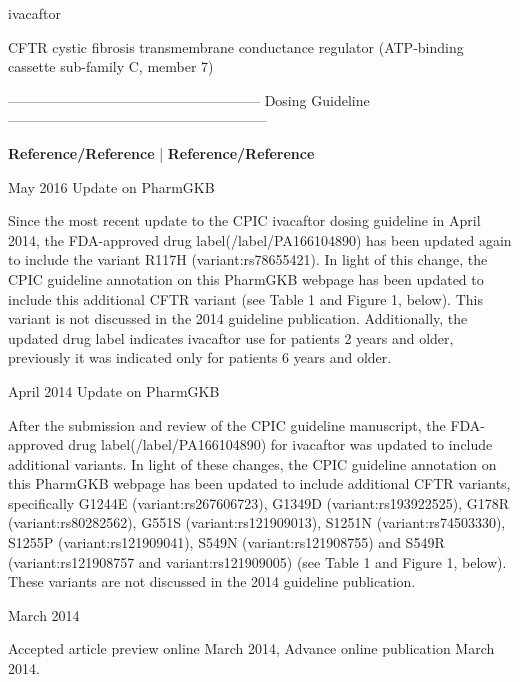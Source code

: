 \documentclass{resume} %
\begin{document}
\begin{rSection}{ ivacaftor }
\item[]
\begin{rSubsection}{ CFTR }{ cystic fibrosis transmembrane conductance regulator (ATP-binding cassette sub-family C, member 7) }{}{}
\item[]
\item[] ------------------------------------------------------ Dosing Guideline --------------------------------------------------------\newline
\item[]
\item[] \textbf{ Reference/Reference } | \textbf{ Reference/Reference }
\item May 2016 Update on PharmGKB
 \newline
\item Since the most recent update to the CPIC ivacaftor dosing guideline in April 2014, the FDA-approved drug label(/label/PA166104890) has been updated again to include the variant R117H (variant:rs78655421). In light of this change, the CPIC guideline annotation on this PharmGKB webpage has been updated to include this additional CFTR variant (see Table 1 and Figure 1, below). This variant is not discussed in the 2014 guideline publication. Additionally, the updated drug label indicates ivacaftor use for patients 2 years and older,  previously it was indicated only for patients 6 years and older. 
 \newline
\item April 2014 Update on PharmGKB
 \newline
\item After the submission and review of the CPIC guideline manuscript, the FDA-approved drug label(/label/PA166104890) for ivacaftor was updated to include additional variants. In light of these changes, the CPIC guideline annotation on this PharmGKB webpage has been updated to include additional CFTR variants, specifically G1244E (variant:rs267606723), G1349D (variant:rs193922525), G178R (variant:rs80282562), G551S (variant:rs121909013), S1251N (variant:rs74503330), S1255P (variant:rs121909041), S549N (variant:rs121908755) and S549R (variant:rs121908757 and variant:rs121909005) (see Table 1 and Figure 1, below).  These variants are not discussed in the 2014 guideline publication.
 \newline
\item March 2014
 \newline
\item Accepted article preview online March 2014,  Advance online publication March 2014.

\end{rSubsection}
\end{rSection}
\end{document}
